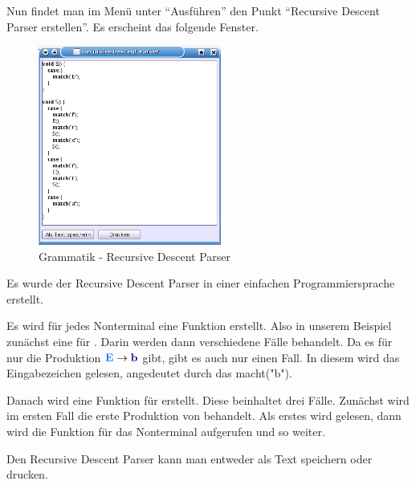 Nun findet man im Menü unter "`Ausführen"' den Punkt "`Recursive Descent Parser erstellen"'. Es erscheint das folgende Fenster.

\begin{figure}[h]
\begin{center}
\includegraphics[width=6cm]{../images/rdp.png}
\caption{Grammatik - Recursive Descent Parser}
\end{center}
\end{figure}

Es wurde der Recursive Descent Parser in einer einfachen Programmiersprache erstellt.

Es wird für jedes Nonterminal eine Funktion erstellt. Also in unserem Beispiel zunächst eine für . Darin werden dann verschiedene Fälle behandelt. Da es für  nur die Produktion $\NonterminalSymbol{E} \to \TerminalSymbol{b}$ gibt, gibt es auch nur einen Fall. In diesem wird das Eingabezeichen  gelesen, angedeutet durch das macht("b").

Danach wird eine Funktion für  erstellt. Diese beinhaltet drei Fälle. Zunächst wird im ersten Fall die erste Produktion von  behandelt. Als erstes wird  gelesen, dann wird die Funktion für das Nonterminal  aufgerufen und so weiter.

Den Recursive Descent Parser kann man entweder als Text speichern oder drucken.
